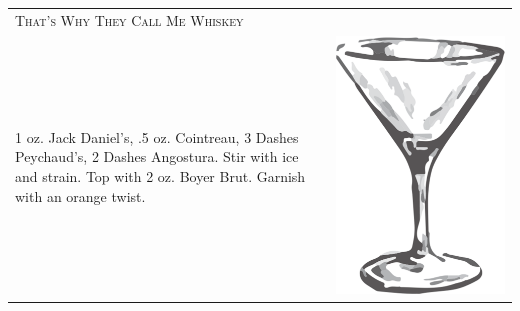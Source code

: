 \documentclass{article}
\begin{document}
\begin{tabular}{p{2in} p{0.5in}}
\multicolumn{2}{p{3in}}{\centering\Huge\textsc{That's Why They Call Me Whiskey}} \\ 
  \vspace{-0.1in}1 oz. Jack Daniel's, .5 oz. Cointreau, 3 Dashes Peychaud's, 2 Dashes Angostura. Stir with ice and strain. Top with 2 oz. Boyer Brut. Garnish with an orange twist. &
   \vspace{-0.1in} \includegraphics{goblet.png}
\end{tabular}
\end{document}
